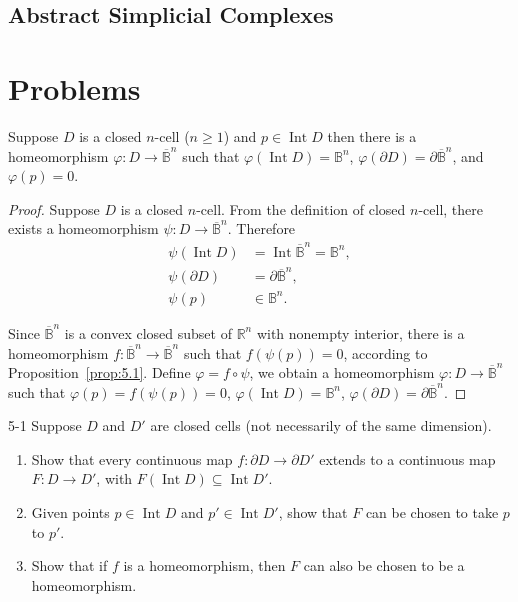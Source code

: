 \subsection{Abstract Simplicial Complexes}

\section*{Problems}

\begin{note}\label{note:closed-cell-homeomorphism}
	Suppose \( D \) is a closed \( n \)-cell (\( n\geq 1 \)) and \( p\in \operatorname{Int} D \) then there is a homeomorphism \( \varphi: D \to \overline{\mathbb{B}}^{n} \) such that \( \varphi(\operatorname{Int} D) = \mathbb{B}^{n} \), \( \varphi(\partial D) = \partial \overline{\mathbb{B}}^{n} \), and \( \varphi(p) = 0 \).
\end{note}

\begin{proof}
	Suppose \( D \) is a closed \( n \)-cell. From the definition of closed \( n \)-cell, there exists a homeomorphism \( \psi: D \to \overline{\mathbb{B}}^{n} \). Therefore
	\begin{align*}
		\psi(\operatorname{Int} D) & = \operatorname{Int} \overline{\mathbb{B}}^{n} = \mathbb{B}^{n}, \\
		\psi(\partial D)           & = \partial \overline{\mathbb{B}}^{n},                            \\
		\psi(p)                    & \in \mathbb{B}^{n}.
	\end{align*}

	Since \( \overline{\mathbb{B}}^{n} \) is a convex closed subset of \( \mathbb{R}^{n} \) with nonempty interior, there is a homeomorphism \( f: \overline{\mathbb{B}}^{n} \to \overline{\mathbb{B}}^{n} \) such that \( f(\psi(p)) = 0 \), according to Proposition~\ref{prop:5.1}. Define \( \varphi = f\circ \psi \), we obtain a homeomorphism \( \varphi: D \to \overline{\mathbb{B}}^{n} \) such that \( \varphi(p) = f(\psi(p)) = 0 \), \( \varphi(\operatorname{Int} D) = \mathbb{B}^{n} \), \( \varphi(\partial D) = \partial \overline{\mathbb{B}}^{n} \).
\end{proof}

\begin{problem}{5-1}\label{problem:5-1}
Suppose \( D \) and \( D' \) are closed cells (not necessarily of the same dimension).
\begin{enumerate}[label={(\alph*)}]
	\item Show that every continuous map \( f: \partial D \to \partial D' \) extends to a continuous map \( F: D \to D' \), with \( F(\operatorname{Int} D) \subseteq \operatorname{Int} D' \).
	\item Given points \( p \in \operatorname{Int} D \) and \( p' \in \operatorname{Int} D' \), show that \( F \) can be chosen to take \( p \) to \( p' \).
	\item Show that if \( f \) is a homeomorphism, then \( F \) can also be chosen to be a homeomorphism.
\end{enumerate}
\end{problem}

